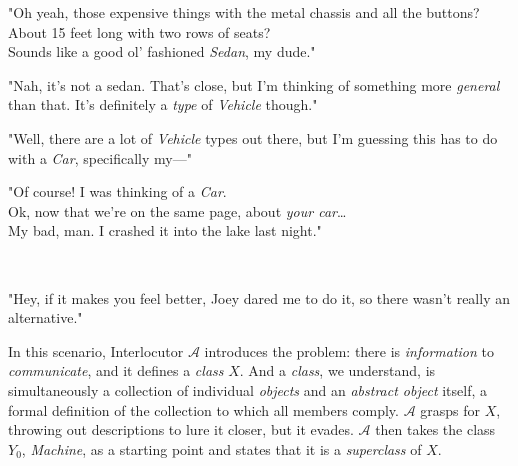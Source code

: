 \begin{addmargin}[2em]{8em}
"Oh yeah, those expensive things with the metal chassis and all the buttons? About 15 feet long with two rows of seats? \\[2mm]
Sounds like a good ol' fashioned \textit{Sedan}, my dude." \\
\end{addmargin}

\begin{addmargin}[8em]{2em}
	\begin{flushright}
		"Nah, it's not a sedan. That's close, but I'm thinking of something more \textit{general} than that. It's definitely a \textit{type} of \textit{Vehicle} though." \\[\baselineskip]
	\end{flushright}
\end{addmargin}

\begin{addmargin}[2em]{8em}
	"Well, there are a lot of \textit{Vehicle} types out there, but I'm guessing this has to do with a \textit{Car}, specifically my---" \\
\end{addmargin}

\begin{addmargin}[8em]{2em}
	\begin{flushright}
		"Of course! I was thinking of a \textit{Car}. \\[2mm]
		Ok, now that we're on the same page, about \textit{your car}\dots \\
		My bad, man. I crashed it into the lake last night." \\[\baselineskip]
	\end{flushright}
\end{addmargin}

\begin{addmargin}[2em]{8em}
	\mydots \\
\end{addmargin}

\begin{addmargin}[8em]{2em}
	\begin{flushright}
		"Hey, if it makes you feel better, Joey dared me to do it, so there wasn't really an alternative." \\[2\baselineskip]
	\end{flushright}
\end{addmargin}

In this scenario, Interlocutor $\mathcal{A}$ introduces the problem: there is \textit{information} to \textit{communicate}, and it defines a \textit{class} $X$. And a \textit{class}, we understand, is simultaneously a collection of individual \textit{objects} and an \textit{abstract object} itself, a formal definition of the collection to which all members comply. $\mathcal{A}$ grasps for $X$, throwing out descriptions to lure it closer, but it evades. $\mathcal{A}$ then takes the class $Y_0$, \textit{Machine}, as a starting point and states that it is a \textit{superclass} of $X$. \\

